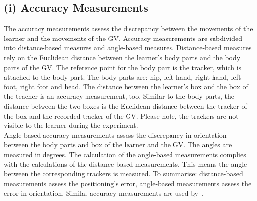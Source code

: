 \subsection{(i) Accuracy Measurements}
The accuracy measurements assess the discrepancy between the movements of the learner and the movements of the GV. Accuracy measurements are subdivided into distance-based measures and angle-based measures. Distance-based measures rely on the Euclidean distance between the learner's body parts and the body parts of the GV. The reference point for the body part is the tracker, which is attached to the body part. The body parts are: hip, left hand, right hand, left foot, right foot and head. The distance between the learner's box and the box of the teacher is an accuracy measurement, too. Similar to the body parts, the distance between the two boxes is the Euclidean distance between the tracker of the box and the recorded tracker of the GV. Please note, the trackers are not visible to the learner during the experiment.\\
Angle-based accuracy measurements assess the discrepancy in orientation between the body parts and box of the learner and the GV. The angles are measured in degrees. The calculation of the angle-based measurements complies with the calculations of the distance-based measurements. This means the angle between the corresponding trackers is measured. To summarise: distance-based measurements assess the positioning's error, angle-based measurements assess the error in orientation. Similar accuracy measurements are used by~\cite{onebody,thaichichua,YouMove,physioathome,vrdancetrainer,lightguide}.

